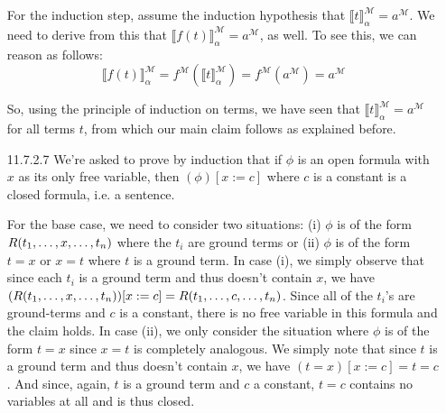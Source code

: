 \begin{itemize}
                    For the induction step, assume the induction
                    hypothesis that $\llbracket
                    t\rrbracket^\mathcal{M}_\alpha=a^\mathcal{M}$. We
                    need to derive from this that $\llbracket
                    f(t)\rrbracket^\mathcal{M}_\alpha=a^\mathcal{M}$,
                    as well. To see this, we can reason as follows:
                    \[\llbracket
                    f(t)\rrbracket^\mathcal{M}_\alpha=f^\mathcal{M}(\llbracket
                    t\rrbracket^\mathcal{M}_\alpha)=f^\mathcal{M}(a^\mathcal{M})=a^\mathcal{M}\]

                  So, using the principle of induction on terms, we
                  have seen that  $\llbracket
                    t\rrbracket^\mathcal{M}_\alpha=a^\mathcal{M}$ for
                    all terms $t$, from which our main claim follows
                    as explained before.

                  \item[11.7.2.7] We're asked to prove by induction that
                    if $\phi$ is an open formula with $x$ as its only
                    free variable, then $(\phi)[x:=c]$ where $c$ is a
                    constant is a closed formula, i.e. a sentence.

                    For the base case, we need to consider two
                    situations: (i) $\phi$ is of the form $R(t_1,
                    \mathellipsis, x, \mathellipsis, t_n)$ where the
                    $t_i$ are ground terms or (ii)
                    $\phi$ is of the form $t=x$ or $x=t$ where $t$ is
                    a ground term. In case (i),
                    we simply observe that since each $t_i$ is a
                    ground term and thus doesn't contain $x$, we have $(R(t_1,
                    \mathellipsis, x, \mathellipsis,
                    t_n))[x:=c]=R(t_1, \mathellipsis, c,\mathellipsis,
                    t_n)$. Since all of the $t_i$'s are ground-terms
                    and $c$ is a constant, there is no free variable
                    in this formula and the claim holds. In case (ii),
                    we only consider the situation where $\phi$ is of
                    the form $t=x$ since $x=t$ is completely
                    analogous. We simply note that  since $t$ is a
                    ground term and thus doesn't contain $x$, we have
                    $(t=x)[x:=c]=t=c$. And since, again, $t$ is a
                    ground term and $c$ a constant, $t=c$ contains no
                    variables at all and is thus closed.


\end{itemize}
